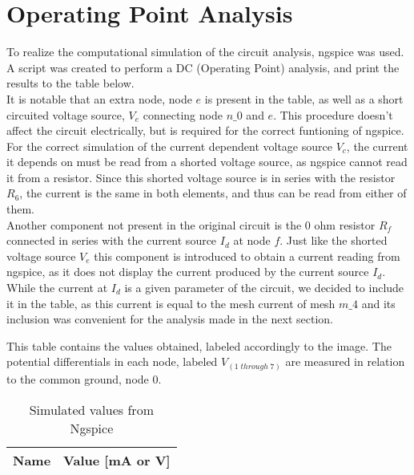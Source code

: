 \section{Operating Point Analysis}
\label{sec:simulation}

To realize the computational simulation of the circuit analysis, ngspice was used. A script was created to perform a DC (Operating Point) analysis, and print the results to the table below.\\
It is notable that an extra node, node $e$ is present in the table, as well as a short circuited voltage source, $V_{e}$ connecting node $n\_0$ and $e$. This procedure doesn't affect the circuit electrically, but is required for the correct funtioning of ngspice. For the correct simulation of the current dependent voltage source $V_{c}$, the current it depends on must be read from a shorted voltage source, as ngspice cannot read it from a resistor. Since this shorted voltage source is in series with the resistor $R_{6}$, the current is the same in both elements, and thus can be read from either of them.\\
Another component not present in the original circuit is the 0 ohm resistor $R_{f}$ connected in series with the current source $I_{d}$ at node $f$. Just like the shorted voltage source $V_{e}$ this component is introduced to obtain a current reading from ngspice, as it does not display the current produced by the current source $I_{d}$. While the current at $I_{d}$ is a given parameter of the circuit, we decided to include it in the table, as this current is equal to the mesh current of mesh $m\_4$ and its inclusion was convenient for the analysis made in the next section.

This table contains the values obtained, labeled accordingly to the image. The potential differentials in each node, labeled $V_{(1 \; through \; 7)}$ are measured in relation to the common ground, node 0. 


\FloatBarrier
\begin{table}[h]
  \centering
  \begin{tabular}{|l|r|}
    \hline    
    {\bf Name} & {\bf Value [mA or V]} \\ \hline
    
  \end{tabular}
  \caption{Simulated values from Ngspice}
  \label{tab:op}
\end{table}
\FloatBarrier


